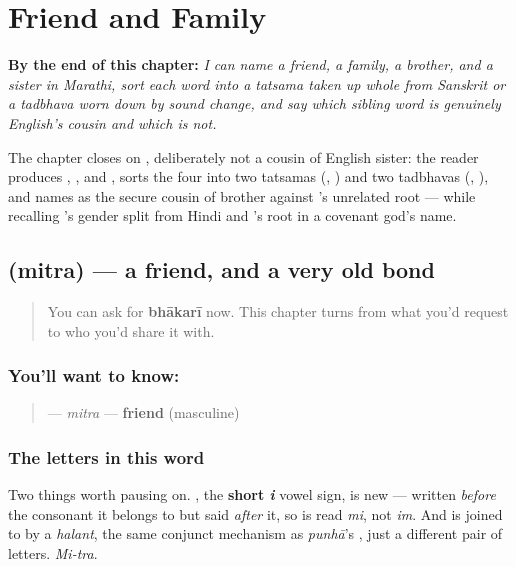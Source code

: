 
\chapter{Friend and Family}
\label{ch:mr-friend-and-family}

\begin{chapteropening}
\textbf{By the end of this chapter:} \emph{I can name a friend, a family, a brother, and a sister in Marathi, sort each word into a tatsama taken up whole from Sanskrit or a tadbhava worn down by sound change, and say which sibling word is genuinely English's cousin and which is not.}

The chapter closes on , deliberately not a cousin of English sister: the reader produces , ,  and , sorts the four into two tatsamas (, ) and two tadbhavas (, ), and names  as the secure cousin of brother against 's unrelated root — while recalling 's gender split from Hindi and 's root in a covenant god's name.
\end{chapteropening}

\section[\texorpdfstring{\mr{मित्र} (mitra)}{मित्र (mitra)}]{ (mitra) — a friend, and a very old bond}

\label{lesson:MR-C11-mitra}



\begin{quote}
You can ask for \textbf{bhākarī} now. This chapter turns from what you'd request to who you'd share it with.
\end{quote}

\subsection*{You'll want to know: }
\begin{quote}
\textbf{} — \emph{mitra} — \textbf{friend} (masculine)
\end{quote}

\subsection*{The letters in this word}
Two things worth pausing on. \textbf{}, the \textbf{short \emph{i}} vowel sign, is new — written \emph{before} the consonant it belongs to but said \emph{after} it, so \textbf{} is read \emph{mi}, not \emph{im}. And \textbf{} is \textbf{} joined to \textbf{} by a \emph{halant}, the same conjunct mechanism as \emph{punhā}'s \textbf{}, just a different pair of letters. \emph{Mi-tra}.

